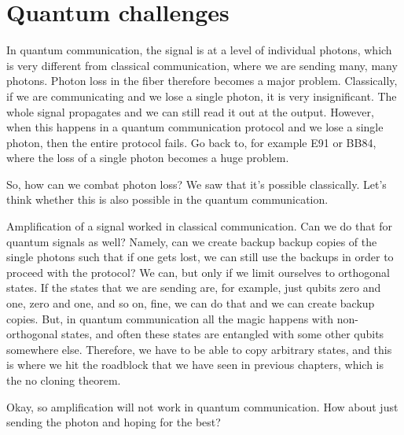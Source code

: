 \section{Quantum challenges}

In quantum communication, the signal is at a level of individual photons, which is very different from classical communication, where we are sending many, many photons. Photon loss in the fiber therefore becomes a major problem. Classically, if we are communicating and we lose a single photon, it is very insignificant. The whole signal propagates and we can still read it out at the output. However, when this happens in a quantum communication protocol and we lose a single photon, then the entire protocol fails. Go back to, for example E91 or BB84, where the loss of a single photon becomes a huge problem.

So, how can we combat photon loss? We saw that it's possible classically. Let's think whether this is also possible in the quantum communication.

Amplification of a signal worked in classical communication. Can we do that for quantum signals as well? Namely, can we create backup backup copies of the single photons such that if one gets lost, we can still use the backups in order to proceed with the protocol? We can, but only if we limit ourselves to orthogonal states. If the states that we are sending are, for example, just qubits zero and one, zero and one, and so on, fine, we can do that and we can create backup copies. But, in quantum communication all the magic happens with non-orthogonal states, and often these states are entangled with some other qubits somewhere else. Therefore, we have to be able to copy arbitrary states, and this is where we hit the roadblock that we have seen in previous chapters, which is the no cloning theorem.

Okay, so amplification will not work in quantum communication. How about just sending the photon and hoping for the best?


